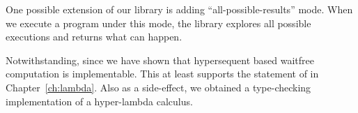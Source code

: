 One possible extension of our library is adding ``all-possible-results''
mode.  When we execute a program under this mode, the library explores
all possible executions and returns what can happen.

Notwithstanding, since we have shown that hypersequent based waitfree computation
is implementable.  This at least supports the statement of
 in Chapter~\ref{ch:lambda}.
Also as a side-effect, we obtained a type-checking implementation of a
hyper-lambda calculus.
